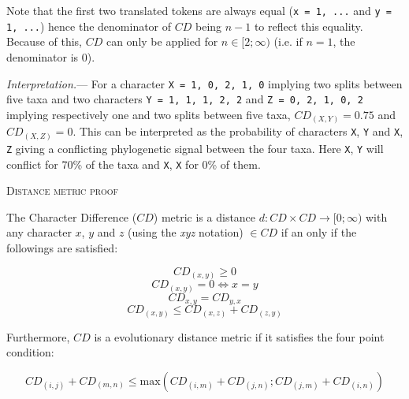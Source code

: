 \documentclass[12pt,letterpaper]{article}
\renewcommand{\section}[1]{%
\bigskip
\begin{center}
\begin{Large}
\normalfont\scshape #1
\medskip
\end{Large}
\end{center}}
\renewcommand{\subsection}[1]{%
\bigskip
\begin{center}
\begin{large}
\normalfont\itshape #1
\end{large}
\end{center}}
\renewcommand{\subsection}[1]{%
\vspace{2ex}
\noindent
\textit{#1.}---}
\begin{document}
Note that the first two translated tokens are always equal (\texttt{x = {1, ...}} and \texttt{y = {1, ...}}) hence the denominator of $CD$ being $n - 1$ to reflect this equality.
Because of this, $CD$ can only be applied for $n \in [2;\infty)$ (i.e. if $n = 1$, the denominator is 0).

\subsection{Interpretation}
For a character \texttt{X = {1, 0, 2, 1, 0}} implying two splits between five taxa and two characters \texttt{Y = {1, 1, 1, 2, 2}} and \texttt{Z = {0, 2, 1, 0, 2}} implying respectively one and two splits between five taxa, $CD_{(X,Y)} = 0.75$ and $CD_{(X,Z)} = 0$.
This can be interpreted as the probability of characters \texttt{X}, \texttt{Y} and \texttt{X}, \texttt{Z} giving a conflicting phylogenetic signal between the four taxa.
Here \texttt{X}, \texttt{Y} will conflict for 70\% of the taxa and \texttt{X}, \texttt{X} for 0\% of them.


\section{Distance metric proof}

The Character Difference ($CD$) metric is a distance $d: CD \times CD \rightarrow [0;\infty)$ with any character $x$, $y$ and $z$ (using the \textit{xyz} notation) $\in CD$ if an only if the followings are satisfied:

\begin{equation}
    \label{Positivity}
    CD_{(x,y)} \geq 0
\end{equation}
\begin{equation}
    \label{Identity}
    CD_{(x,y)} = 0 \Leftrightarrow x = y
\end{equation}
\begin{equation}
    \label{Equality}
    CD_{x,y} = CD_{y,x}
\end{equation}
\begin{equation}
    \label{Subadditivity}
    CD_{(x,y)} \leq CD_{(x,z)} + CD_{(z,y)}
\end{equation}

\noindent Furthermore, $CD$ is a evolutionary distance metric if it satisfies the four point condition:

\begin{equation}
    \label{fourpoint}
    CD_{(i,j)} + CD_{(m,n)} \leq \text{max}{(CD_{(i,m)} + CD_{(j,n)} ; CD_{(j,m)} + CD_{(i,n)} )}
\end{equation}
\end{document}
